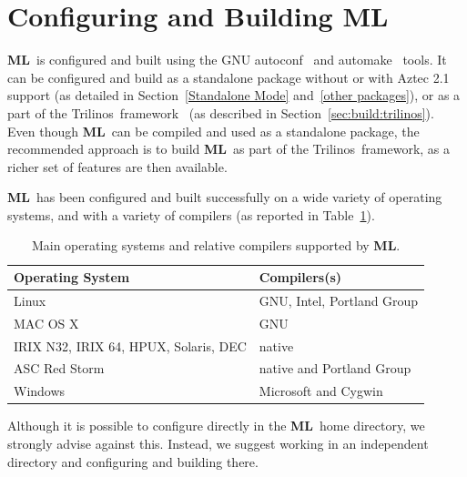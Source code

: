 \documentclass{article}[11pt]
\newcommand{\ML}     {{\bf ML}}
\newcommand{\trilinos}  {{\sc Trilinos}}
\begin{document}
\section{Configuring and Building \ML}
\label{configure}
%
\ML\ is configured and built using the GNU autoconf~\cite{Autoconf} and
automake~\cite{Automake} tools.  It can be configured and build as a
standalone package without or with {\sc Aztec 2.1} support (as detailed
in Section~\ref{Standalone Mode} and~\ref{other packages}), or as a part
of the \trilinos~framework~\cite{Trilinos-home-page} (as described in
Section~\ref{sec:build:trilinos}). Even though \ML\ can be compiled and
used as a standalone package, the recommended approach is to build
\ML~as part of the \trilinos~framework, as a richer set of features are
then available.


\ML\ has been configured and built successfully on a wide variety of
operating systems, and with a variety of compilers (as reported in
Table~\ref{tab:compilers}).


\begin{table}[htbp]
  \centering
  \begin{tabular}{| l l |}
    \hline
    Operating System & Compilers(s) \\
    \hline
    Linux  & GNU, Intel, Portland Group  \\
    MAC OS X  & GNU  \\
    IRIX N32, IRIX 64, HPUX, Solaris, DEC & native  \\
    ASC Red Storm & native and Portland Group \\
    Windows & Microsoft and Cygwin \\
   \hline
  \end{tabular}
  \caption{Main operating systems and relative compilers supported by \ML.}
  \label{tab:compilers}
\end{table}

Although it is possible to configure directly in the \ML\ home directory,
we strongly advise against this.  Instead, we suggest working in an
independent directory and configuring and building there.

%
%
\end{document}
